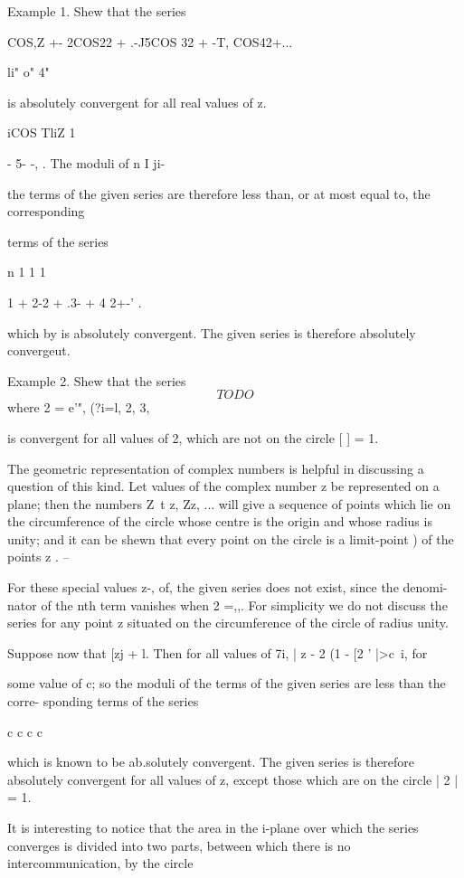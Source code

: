 Example 1. Shew that the series

COS,Z +- 2COS22 + .-J5COS 32 + -T, COS42+...

li" o" 4"

is absolutely convergent for all real values of z.

iCOS TliZ 1

- 5- -, . The moduli of n I ji-

the terms of the given series are therefore less than, or at most
equal to, the corresponding

terms of the series

n 1 1 1

1 + 2-2 + .3- + 4 2+-' .

which by is absolutely convergent. The given series is
therefore absolutely convergeut.

Example 2. Shew that the series
$$
TODO
$$
where 2 = e'", (?i=l, 2, 3,

is convergent for all values of 2, which are not on the circle [ ] =
1.

%
%

The geometric representation of complex numbers is helpful in
discussing a question of this kind. Let values of the complex number z
be represented on a plane; then the numbers Z\ t z, Zz, ... will
give a sequence of points which lie on the circumference of the circle
whose centre is the origin and whose radius is unity; and it can be
shewn that every point on the circle is a limit-point ) of the
points z . --

For these special values z-, of, the given series does not exist,
since the denomi- nator of the nth term vanishes when 2 =,,. For
simplicity we do not discuss the series for any point z situated on
the circumference of the circle of radius unity.

Suppose now that [zj + l. Then for all values of 7i, | z - 2 (1 - [2 '
|>c~i, for

some value of c; so the moduli of the terms of the given series are
less than the corre- sponding terms of the series

c c c c

which is known to be ab.solutely convergent. The given series is
therefore absolutely convergent for all values of z, except those
which are on the circle | 2 | = 1.

It is interesting to notice that the area in the i-plane over which
the series converges is divided into two parts, between which there is
no intercommunication, by the circle

